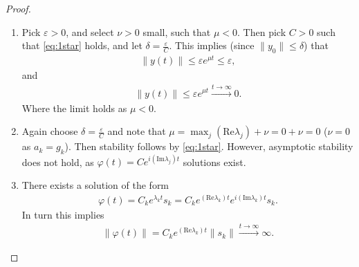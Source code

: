 \begin{proof}
	\begin{enumerate}
		\item Pick $\varepsilon > 0$, and select $\nu > 0$ small, such that $\mu <0$. Then pick $C> 0$ such that \eqref{eq:1star} holds, and let $\delta = \frac{\varepsilon}{C}$. This implies (since $\| {y} _0\| \leq \delta $) that
			\begin{align}
				\| {y} (t) \| \leq \varepsilon e^{\mu t} \leq \varepsilon,
			\end{align}
		and
		\begin{align}
			\| {y} (t) \| \leq \varepsilon e^{\mu t} \xrightarrow{t \to \infty } 0. 
		\end{align}
	Where the limit holds as $\mu < 0$.	
\item Again choose $\delta = \frac{\varepsilon}{C}$ and note that $\mu  = \max_{j} ( \textrm{Re} \lambda _j) + \nu = 0 + \nu =0$ ($\nu =0$ as $a_k = g_k$). Then stability follows by \eqref{eq:1star}. However, asymptotic stability does not hold, as $\varphi(t) = C e^{i ( \textrm{Im} \lambda _j)t} $ solutions exist.

\item There exists a solution of the form
	\begin{align}
		{	\varphi}(t) = C_k e^{\lambda _k t} {s} _k = C_k e^{( \textrm{Re}  \lambda _k)t} e ^{i ( \textrm{Im} \lambda _k)t}{s} _k.
	\end{align}
In turn this implies
\begin{align}
	\| {\varphi}(t) \| = C_k e^{( \textrm{Re} \lambda_k) t} \| {s} _k \| \xrightarrow{t \to \infty} \infty .
\end{align}

	\end{enumerate}
\end{proof}

